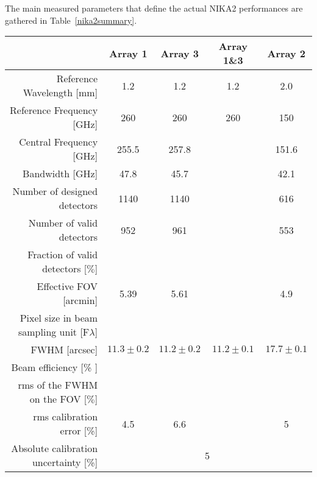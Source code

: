 The main measured parameters that define the actual NIKA2 performances are gathered in Table~\ref{nika2summary}.

\begin{table}[h]
\begin{center}    
  \begin{threeparttable}
    \begin{tabular}{|r|c|c|c|c|}
      \hline
      & Array 1 & Array 3  & Array 1\&3 & Array 2 \\
      \hline
      \hline
      Reference Wavelength  [mm]  &  1.2   &  1.2  & 1.2 & 2.0   \\
      Reference Frequency  [GHz]  &  260   &  260  & 260 & 150  \\
      Central Frequency [GHz]     &  255.5  &    257.8     &     &   151.6  \\
      Bandwidth         [GHz]     &   47.8  &     45.7     &     &    42.1  \\
      \hline
      Number of designed detectors       & 1140      &  1140    &    &    616  \\
      Number of valid detectors          &  952      &   961    &    &    553  \\
      Fraction of valid detectors [$\%$] &           &          &    &         \\
      Effective FOV\tnote{a}\hspace{1mm} [arcmin]    &   5.39    &   5.61    &    &   4.9  \\
      \hline
      Pixel size in beam sampling unit [F$\lambda$]  &    &   &    &   \\
      \hline
      FWHM\tnote{b}\hspace{1mm} [arcsec]  &  $11.3 \pm 0.2$   &  $11.2 \pm 0.2$  &   $11.2 \pm 0.1$  &  $17.7 \pm 0.1$ \\
      Beam efficiency\tnote{c}\hspace{1mm} [\% ]    &        &    &     &    \\
      rms of the FWHM on the FOV [$\%$]   &   &    &   &  \\
      \hline 
      rms calibration error [\%]            & 4.5  & 6.6  &   & 5  \\
      \hline
      Absolute calibration uncertainty [\%] &  \multicolumn{4}{|c|}{5} \\
      \hline

\end{tabular}
\end{threeparttable}
\end{center}
\end{table}
